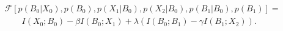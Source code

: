 \begin{align}
&\mathcal{F}[p(B_{0}|X_{0}), p({ B}_{0}), p({ X}_{1}\vert{ B}_{0}), p({ X}_{2}\vert{ B}_{0}), p(B_{1}|B_{0}), p({ B}_{1})]= \nonumber \\
&\qquad I(X_{0};B_{0})-\beta I(B_{0};X_{1})
+\lambda \left(I(B_{0};B_{1})-\gamma I(B_{1};X_{2})\right).
\label{eqn:lagrangeFunctional}
\end{align}


